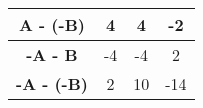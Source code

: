 \documentclass[12pt, a4paper, onside, polish]{article}				%
\begin{document}
\begin{table}[hbt!]
\begin{tabular}{|c|ccc|}
\cellcolor[HTML]{EFEFEF}\textbf{A - (-B)}  & \multicolumn{1}{c|}{4}                                             & \multicolumn{1}{c|}{4}                                              & -2                                             \\ \hline
\cellcolor[HTML]{EFEFEF}\textbf{-A - B}    & \multicolumn{1}{c|}{-4}                                            & \multicolumn{1}{c|}{-4}                                             & 2                                              \\ \hline
\cellcolor[HTML]{EFEFEF}\textbf{-A - (-B)} & \multicolumn{1}{c|}{2}                                             & \multicolumn{1}{c|}{10}                                             & -14                                            \\ \hline
\end{tabular}
\end{table}
\end{document}
